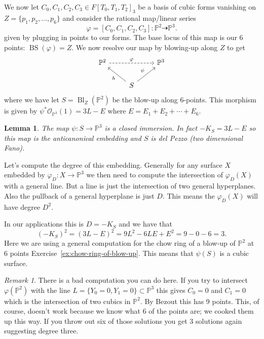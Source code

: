 \documentclass[12pt]{article}
\numberwithin{equation}{section}
\newtheorem{lemma}[theorem]{Lemma}
\theoremstyle{definition}
\theoremstyle{remark}
\newtheorem{remark}[theorem]{Remark}
\newcommand{\Ocal}{\mathcal{O}}
\newcommand{\PP}{\mathbb{P}}
\newcommand{\Bl}{\operatorname{Bl}}
\newcommand{\BS}{\operatorname{BS}}
\begin{document}
We now let $C_0,C_1,C_2,C_3 \in F[T_0,T_1,T_2]_3$ be a basis of cubic forms vanishing on $Z = \lbrace p_1,p_2,\ldots,p_6\rbrace$  and consider the rational map/linear series
$$ \varphi=[C_0,C_1,C_2,C_3]: \PP^2 \dashrightarrow \PP^3.$$
given by plugging in points to our  forms. 
The base locus of this map is our 6 points: $\BS(\varphi)=Z$.
We now resolve our map by blowing-up along $Z$ to get 
$$\begin{tikzcd}
\PP^2 \ar[rr,dashed,"\varphi"] & & \PP^3 \\
& S \ar[ur,"\psi"] \ar[ul,"h"] & 
\end{tikzcd}
$$
where we have let $S=\Bl_Z(\PP^2)$ be the blow-up along $6$-points.
This morphism is given by $\psi^*\Ocal_{\PP^3}(1) = 3L-E$ where $E=E_1+E_2+\cdots+E_6$.

\begin{lemma}
	The map $\psi:S \to \PP^3$ is a closed immersion. In fact $-K_S=3L-E$ so this map is the anticanonical embedding and $S$ is del Pezzo (two dimensional Fano). 
\end{lemma}

Let's compute the degree of this embedding.
Generally for any surface $X$ embedded by $\varphi_D:X \to \PP^3$ we then need to compute the intersection of $\varphi_D(X)$ with a general line. 
But a line is just the intersection of two general hyperplanes. 
Also the pullback of a general hyperplane is just $D$. 
This means the $\varphi_D(X)$ will have degree $D^2$. 

In our applications this is $D=-K_S$ and we have that 
$$ (-K_S)^2 = (3L-E)^2 = 9L^2-6LE+E^2 = 9-0-6 = 3. $$
Here we are using a general computation for the chow ring of a blow-up of $\PP^2$ at 6 points Exercise~\ref{ex:chow-ring-of-blow-up}.
This means that $\psi(S)$ is a cubic surface. 

\begin{remark}
	There is a bad computation you can do here. 
	If you try to intersect $\varphi(\PP^2)$ with the line $L=\lbrace Y_0=0, Y_1=0 \rbrace \subset \PP^3$ this gives $C_0=0$ and $C_1=0$ which is the intersection of two cubics in $\PP^2$. 
	By Bezout this has 9 points. 
	This, of course, doesn't work because we know what 6 of the points are; we cooked them up this way. 
	If  you throw out six of those solutions you get 3 solutions again suggesting degree three.
\end{remark}
\end{document}
